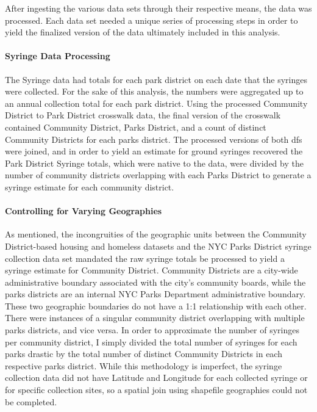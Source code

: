 \documentclass[
]{article}
\begin{document}
After ingesting the various data sets through their respective means,
the data was processed. Each data set needed a unique series of
processing steps in order to yield the finalized version of the data
ultimately included in this analysis.

\paragraph{Syringe Data Processing}\label{syringe-data-processing}

The Syringe data had totals for each park district on each date that the
syringes were collected. For the sake of this analysis, the numbers were
aggregated up to an annual collection total for each park district.
Using the processed Community District to Park District crosswalk data,
the final version of the crosswalk contained Community District, Parks
District, and a count of distinct Community Districts for each parks
district. The processed versions of both dfs were joined, and in order
to yield an estimate for ground syringes recovered the Park District
Syringe totals, which were native to the data, were divided by the
number of community districts overlapping with each Parks District to
generate a syringe estimate for each community district.

\paragraph{Controlling for Varying
Geographies}\label{controlling-for-varying-geographies}

As mentioned, the incongruities of the geographic units between the
Community District-based housing and homeless datasets and the NYC Parks
District syringe collection data set mandated the raw syringe totals be
processed to yield a syringe estimate for Community District. Community
Districts are a city-wide administrative boundary associated with the
city's community boards, while the parks districts are an internal NYC
Parks Department administrative boundary. These two geographic
boundaries do not have a 1:1 relationship with each other. There were
instances of a singular community district overlapping with multiple
parks districts, and vice versa. In order to approximate the number of
syringes per community district, I simply divided the total number of
syringes for each parks drastic by the total number of distinct
Community Districts in each respective parks district. While this
methodology is imperfect, the syringe collection data did not have
Latitude and Longitude for each collected syringe or for specific
collection sites, so a spatial join using shapefile geographies could
not be completed.
\end{document}
